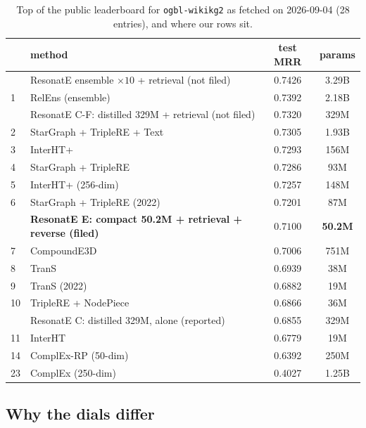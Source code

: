 \documentclass[11pt,a4paper]{article}
\begin{document}
\begin{table}[t]
\centering
\caption{Top of the public leaderboard for \texttt{ogbl-wikikg2} as
fetched on 2026-09-04 \citep{ogbl_wikikg2_leaderboard} (28 entries), and
where our rows sit.}
\label{tab:wboard}
\small
\begin{tabular}{llcc}
\toprule
 & method & test MRR & params \\
\midrule
  & ResonatE ensemble $\times10$ + retrieval (not filed) & 0.7426 & 3.29B \\
1 & RelEns \citep{yue2023relens} (ensemble) & 0.7392 & 2.18B \\
  & ResonatE C-F: distilled 329M + retrieval (not filed) & 0.7320 & 329M \\
2 & StarGraph + TripleRE + Text \citep{li2022stargraph} & 0.7305 & 1.93B \\
3 & InterHT+ \citep{yue2022interht} & 0.7293 & 156M \\
4 & StarGraph + TripleRE \citep{li2022stargraph} & 0.7286 & 93M \\
5 & InterHT+ (256-dim) & 0.7257 & 148M \\
6 & StarGraph + TripleRE (2022) & 0.7201 & 87M \\
  & \textbf{ResonatE E: compact 50.2M + retrieval + reverse (filed)} & $\mathbf{0.7100}$ & \textbf{50.2M} \\
7 & CompoundE3D \citep{ge2023compounde3d} & 0.7006 & 751M \\
8 & TranS \citep{zhang2022trans} & 0.6939 & 38M \\
9 & TranS (2022) & 0.6882 & 19M \\
10 & TripleRE + NodePiece & 0.6866 & 36M \\
  & ResonatE C: distilled 329M, alone (reported) & 0.6855 & 329M \\
11 & InterHT & 0.6779 & 19M \\
14 & ComplEx-RP (50-dim) \citep{chen2021relation} & 0.6392 & 250M \\
23 & ComplEx (250-dim) & 0.4027 & 1.25B \\
\bottomrule
\end{tabular}
\end{table}

\subsection{Why the dials differ}
\label{sec:dials}
\end{document}
